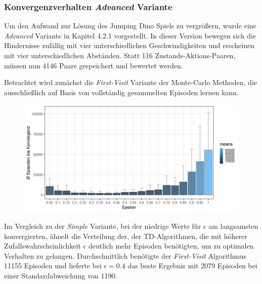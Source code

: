 \subsubsection{Konvergenzverhalten \textit{Advanced} Variante}
Um den Aufwand zur Lösung des Jumping Dino Spiels zu vergrößern, wurde eine \textit{Advanced} Variante in Kapitel 4.2.1 vorgestellt. In dieser Version bewegen sich die Hindernisse zufällig mit vier unterschiedlichen Geschwindigkeiten und erscheinen  mit vier unterschiedlichen Abständen. Statt 116 Zustands-Aktions-Paaren, müssen nun 4146 Paare gespeichert und bewertet werden.
\par 
Betrachtet wird zunächst die \textit{First-Visit} Variante der Monte-Carlo Methoden, die ausschließlich auf Basis von vollständig gesammelten Episoden lernen kann.
\begin{figure}[H]
    \centering
    \includegraphics[width=\textwidth]{images/AdvancedZ3B1MonteCarloA}
    \label{fig:test1}
\end{figure}
Im Vergleich zu der \textit{Simple} Variante, bei der niedrige Werte für $\epsilon$ am langsamsten konvergierten, ähnelt die Verteilung der, der TD-Algorithmen, die mit höherer Zufallswahrscheinlichkeit $\epsilon$ deutlich mehr Episoden benötigten, um zu optimalen Verhalten zu gelangen. Durchschnittlich benötigte der \textit{First-Visit} Algorithmus 11155 Episoden und lieferte bei $\epsilon = 0.4$ das beste Ergebnis mit 2079 Episoden bei einer Standardabweichung von 1190. 
\par 
